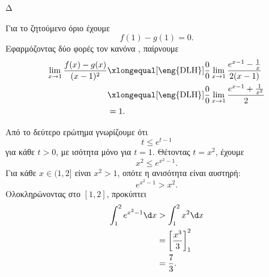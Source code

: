 \begin{thema}{Δ}
\begin{erwthma}
\item Για το ζητούμενο όριο έχουμε
\[
f(1)-g(1)=0.
\]
Εφαρμόζοντας δύο φορές τον κανόνα , παίρνουμε
\begin{align*}
\lim_{x\to1}\frac{f(x)-g(x)}{(x-1)^2}
&\xlongequal[\text{\eng{DLH}}]{\frac{0}{0}}
\lim_{x\to1}\frac{e^{x-1}-\frac{1}{x}}{2(x-1)}\\
&\xlongequal[\text{\eng{DLH}}]{\frac{0}{0}}
\lim_{x\to1}\frac{e^{x-1}+\frac{1}{x^2}}{2}\\
&={1}.
\end{align*}

Από το δεύτερο ερώτημα γνωρίζουμε ότι
\[
t\leq e^{t-1}
\]
για κάθε $t>0$, με ισότητα μόνο για $t=1$. Θέτοντας $t=x^2$, έχουμε
\[
x^2\leq e^{x^2-1}.
\]
Για κάθε $x\in(1,2]$ είναι $x^2>1$, οπότε η ανισότητα είναι αυστηρή:
\[
e^{x^2-1}>x^2.
\]
Ολοκληρώνοντας στο $[1,2]$, προκύπτει
\begin{align*}
\int_1^2e^{x^2-1}\d x
&>\int_1^2x^2\d x\\
&=\left[\frac{x^3}{3}\right]_1^2\\
&={\frac{7}{3}}.
\end{align*}
\end{erwthma}
\end{thema}
